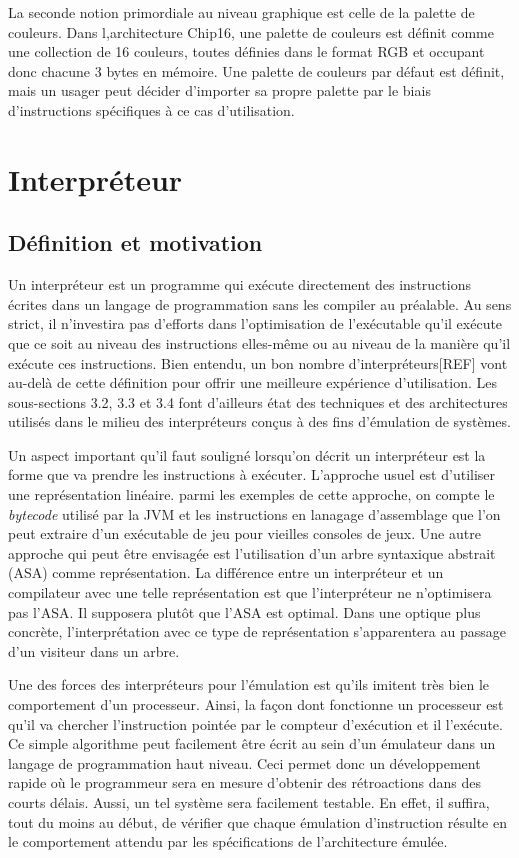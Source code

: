 \documentclass{article} %
\begin{document}
La seconde notion primordiale au niveau graphique est celle de la palette de couleurs. Dans l,architecture Chip16, une palette de couleurs est définit comme une collection de 16 couleurs, toutes définies dans le format RGB et occupant donc chacune 3 bytes en mémoire. Une palette de couleurs par défaut est définit, mais un usager peut décider d'importer sa propre palette par le biais d'instructions spécifiques à ce cas d'utilisation.

\section{Interpréteur}
\subsection{Définition et motivation}
Un interpréteur est un programme qui exécute directement des instructions écrites dans un langage de programmation sans les compiler au préalable. Au sens strict, il n'investira pas d'efforts dans l'optimisation de l'exécutable qu'il exécute que ce soit au niveau des instructions elles-même ou au niveau de la manière qu'il exécute ces instructions. Bien entendu, un bon nombre d'interpréteurs[REF] vont au-delà de cette définition  pour offrir une meilleure expérience d'utilisation. Les sous-sections 
3.2, 3.3 et 3.4 font d'ailleurs état des techniques et des architectures utilisés dans le milieu des interpréteurs conçus à des fins d'émulation de systèmes.

Un aspect important qu'il faut souligné lorsqu'on décrit un interpréteur est la forme que va prendre les instructions à exécuter. L'approche usuel est d'utiliser une représentation linéaire. parmi les exemples de cette approche, on compte le \textit{bytecode} utilisé par la JVM et les instructions en lanagage d'assemblage que l'on peut extraire d'un exécutable de jeu pour vieilles consoles de jeux. Une autre approche qui peut être envisagée est l'utilisation d'un arbre syntaxique abstrait (ASA) comme représentation. La différence entre un interpréteur et un compilateur avec une telle représentation est que l'interpréteur ne n'optimisera pas l'ASA. Il supposera plutôt que l'ASA est optimal. Dans une optique plus concrète, l'interprétation avec ce type de représentation s'apparentera au passage d'un visiteur dans un arbre.

Une des forces des interpréteurs pour l'émulation est qu'ils imitent très bien le comportement d'un processeur. Ainsi, la façon dont fonctionne un processeur est qu'il va chercher l'instruction pointée par le compteur d'exécution et il l'exécute. Ce simple algorithme peut facilement être écrit au sein d'un émulateur dans un langage de programmation haut niveau. Ceci permet donc un développement rapide où le programmeur sera en mesure d'obtenir des rétroactions dans des courts délais. Aussi, un tel système sera facilement testable. En effet, il suffira, tout du moins au début, de vérifier que chaque émulation d'instruction résulte en le comportement attendu par les spécifications de l'architecture émulée.
\end{document}
